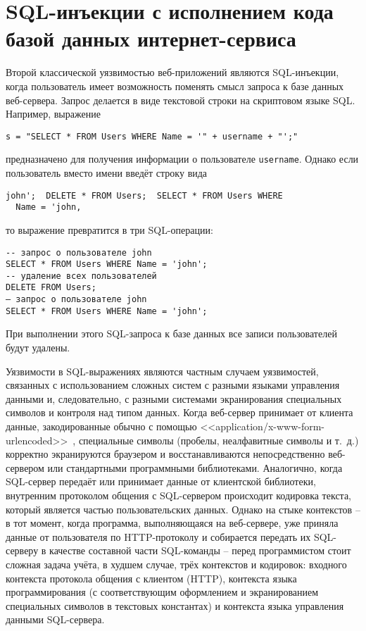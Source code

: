 \section[SQL-инъекции с исполнением кода веб-сервером]{SQL-инъекции с исполнением кода \protect\\ базой данных интернет-сервиса}

Второй классической уязвимостью веб-приложений являются SQL-инъекции, когда пользователь имеет возможность поменять смысл запроса к базе данных веб-сервера. Запрос делается в виде текстовой строки на скриптовом языке SQL. Например, выражение
\begin{verbatim}
s = "SELECT * FROM Users WHERE Name = '" + username + "';"
\end{verbatim}
предназначено для получения информации о пользователе \texttt{username}. Однако если пользователь вместо имени введёт строку вида
\begin{center} \begin{verbatim}
john';  DELETE * FROM Users;  SELECT * FROM Users WHERE
  Name = 'john,
\end{verbatim} \end{center}
то выражение превратится в три SQL-операции:
\begin{verbatim}
-- запрос о пользователе john
SELECT * FROM Users WHERE Name = 'john';
-- удаление всех пользователей
DELETE FROM Users;
– запрос о пользователе john
SELECT * FROM Users WHERE Name = 'john';
\end{verbatim}
При выполнении этого SQL-запроса к базе данных все записи пользователей будут удалены.

Уязвимости в SQL-выражениях являются частным случаем уязвимостей, связанных с использованием сложных систем с разными языками управления данными и, следовательно, с разными системами экранирования специальных символов и контроля над типом данных. Когда веб-сервер принимает от клиента данные, закодированные обычно с помощью <<application/x-www-form-urlencoded>>~\cite{html4:1999}, специальные символы (пробелы, неалфавитные символы и т.~д.) корректно экранируются браузером и восстанавливаются непосредственно веб-сервером или стандартными программными библиотеками. Аналогично, когда SQL-сервер передаёт или принимает данные от клиентской библиотеки, внутренним протоколом общения с SQL-сервером происходит кодировка текста, который является частью пользовательских данных. Однако на стыке контекстов -- в тот момент, когда программа, выполняющаяся на веб-сервере, уже приняла данные от пользователя по HTTP-протоколу и собирается передать их SQL-серверу в качестве составной части SQL-команды -- перед программистом стоит сложная задача учёта, в худшем случае, трёх контекстов и кодировок: входного контекста протокола общения с клиентом (HTTP), контекста языка программирования (с соответствующим оформлением и экранированием специальных символов в текстовых константах) и контекста языка управления данными SQL-сервера.

